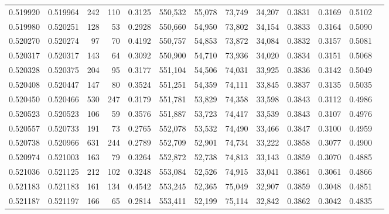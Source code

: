 \begin{tabular}{rrrrrrrrrrrrr}
0.519920 & 0.519964 &   242 &   110 &                                     0.3125 & 550,532 &  55,078 &  73,749 &  34,207 & 0.3831 & 0.3169 & 0.5102 \\
0.519980 & 0.520251 &   128 &    53 &                                     0.2928 & 550,660 &  54,950 &  73,802 &  34,154 & 0.3833 & 0.3164 & 0.5090 \\
0.520270 & 0.520274 &    97 &    70 &                                     0.4192 & 550,757 &  54,853 &  73,872 &  34,084 & 0.3832 & 0.3157 & 0.5081 \\
0.520317 & 0.520317 &   143 &    64 &                                     0.3092 & 550,900 &  54,710 &  73,936 &  34,020 & 0.3834 & 0.3151 & 0.5068 \\
0.520328 & 0.520375 &   204 &    95 &                                     0.3177 & 551,104 &  54,506 &  74,031 &  33,925 & 0.3836 & 0.3142 & 0.5049 \\
0.520408 & 0.520447 &   147 &    80 &                                     0.3524 & 551,251 &  54,359 &  74,111 &  33,845 & 0.3837 & 0.3135 & 0.5035 \\
0.520450 & 0.520466 &   530 &   247 &                                     0.3179 & 551,781 &  53,829 &  74,358 &  33,598 & 0.3843 & 0.3112 & 0.4986 \\
0.520523 & 0.520523 &   106 &    59 &                                     0.3576 & 551,887 &  53,723 &  74,417 &  33,539 & 0.3843 & 0.3107 & 0.4976 \\
0.520557 & 0.520733 &   191 &    73 &                                     0.2765 & 552,078 &  53,532 &  74,490 &  33,466 & 0.3847 & 0.3100 & 0.4959 \\
0.520738 & 0.520966 &   631 &   244 &                                     0.2789 & 552,709 &  52,901 &  74,734 &  33,222 & 0.3858 & 0.3077 & 0.4900 \\
0.520974 & 0.521003 &   163 &    79 &                                     0.3264 & 552,872 &  52,738 &  74,813 &  33,143 & 0.3859 & 0.3070 & 0.4885 \\
0.521036 & 0.521125 &   212 &   102 &                                     0.3248 & 553,084 &  52,526 &  74,915 &  33,041 & 0.3861 & 0.3061 & 0.4866 \\
0.521183 & 0.521183 &   161 &   134 &                                     0.4542 & 553,245 &  52,365 &  75,049 &  32,907 & 0.3859 & 0.3048 & 0.4851 \\
0.521187 & 0.521197 &   166 &    65 &                                     0.2814 & 553,411 &  52,199 &  75,114 &  32,842 & 0.3862 & 0.3042 & 0.4835 \\

\end{tabular}
